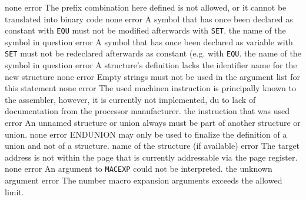 \documentclass[12pt,twoside]{report}
\newcommand{\tty}[1]{{\tt #1}}
\begin{document}
\begin{description}
               {none}
               {error}
               {The prefix combination here defined is not allowed, or it
                cannot be translated into binary code}
               {none}
               {error}
               {A symbol that has once been declared as constant with
                {\tt EQU} must not be modified afterwards with {\tt SET}.}
               {the name of the symbol in question}
               {error}
               {A symbol that has once been declared as variable with
                {\tt SET} must not be redeclared afterwards as constant
                (e.g. with {\tt EQU}.}
               {the name of the symbol in question}
               {error}
               {A structure's definition lacks the identifier name for the
                new structure}
               {none}
               {error}
               {Empty strings must not be used in the argument list for
                this statement}
               {none}
               {error}
               {The used machinen instruction is principally known
                to the assembler, however, it is currently not
                implemented, du to lack of documentation from the
                processor manufacturer.}
               {the instruction that was used}
               {error}
               {An unnamed structure or union always must be part
                of another structure or union.}
               {none}
               {error}
               {ENDUNION may only be used to finalize the definition
                of a union and not of a structure.}
               {name of the structure (if available)}
               {error}
               {The target address is not within the page
                that is currently addressable via the page
                register.}
               {none}
               {error}
               {An argument to \tty{MACEXP} could not be
                interpreted.}
               {the unknown argument}
               {error}
               {The number macro expansion arguments exceeds the allowed limit.}

\end{description}
\end{document}
